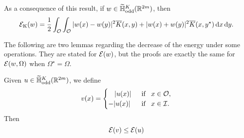 As a consequence of this result, if $w\in \widetilde{\mathbb{H}}^K_{\mathrm{odd}}(\mathbb{R}^{2m})$, then
\begin{equation}
\label{Eq:EnergyOddInOcal}
\mathcal{E}_\mathrm{K}(w) = \frac{1}{2}\int_{\mathcal{O}} \int_{\mathcal{O}}|w(x) - w(y)|^2 \overline{K}(x,y) + |w(x) + w(y)|^2 \overline{K}(x,y^\star) \,\mathrm{d} x \,\mathrm{d} y. 
\end{equation}



The following are two lemmas regarding the decrease of the energy under some operations. They are stated for $\mathcal{E}(w)$, but the proofs are exactly the same for $\mathcal{E}(w, \Omega)$ when $\Omega^\star = \Omega$.
\begin{lemma}
\label{Lemma:TruncationOfFunctions1DecreaseEnergy}
Given $u\in \widetilde{\mathbb{H}}^K_{\mathrm{odd}}(\mathbb{R}^{2m})$, we define
\begin{equation*}
v(x) = \begin{cases}
\hspace{3.2mm}|u(x)| \,\,\, &\text{if } \,\,\, x\in\mathcal{O},\\
-|u(x)| \,\,\, &\text{if } \,\,\, x\in\mathcal{I}.
\end{cases}
\end{equation*}
Then
$$ \mathcal{E}(v) \leq \mathcal{E}(u)  $$
\end{lemma}

